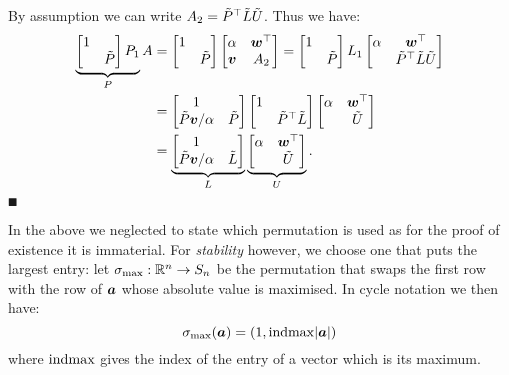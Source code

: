 By assumption we can write $A_2 = {\tilde P}^\top {\tilde L} {\tilde U}$. Thus we have:
\begin{align*}
\underbrace{\begin{bmatrix} 1 \\
            & {\tilde P} \end{bmatrix} P_1}_P A &= \begin{bmatrix} 1 \\
            & {\tilde P} \end{bmatrix}  \begin{bmatrix} \alpha & \bm{{\mbox{\boldmath$w$\unboldmath}}}^\top \\
                        \bm{{\mbox{\boldmath$v$\unboldmath}}} & A_2
                        \end{bmatrix}  =
            \begin{bmatrix} 1 \\ & {\tilde P} \end{bmatrix} L_1  \begin{bmatrix} \alpha & \bm{{\mbox{\boldmath$w$\unboldmath}}}^\top \\  & {\tilde P}^\top {\tilde L}  {\tilde U} \end{bmatrix} \\
            &= \begin{bmatrix}
1 \\
{\tilde P} \bm{{\mbox{\boldmath$v$\unboldmath}}}/\alpha & {\tilde P} \end{bmatrix} \begin{bmatrix} 1 &  \\  &  {\tilde P}^\top {\tilde L}  \end{bmatrix}  \begin{bmatrix} \alpha & \bm{{\mbox{\boldmath$w$\unboldmath}}}^\top \\  &  {\tilde U} \end{bmatrix} \\
&= \underbrace{\begin{bmatrix}
1 \\
{\tilde P} \bm{{\mbox{\boldmath$v$\unboldmath}}}/\alpha & {\tilde L}  \end{bmatrix}}_L \underbrace{\begin{bmatrix} \alpha & \bm{{\mbox{\boldmath$w$\unboldmath}}}^\top \\  &  {\tilde U} \end{bmatrix}}_U. \\
\end{align*}
\ensuremath{\QED}

In the above we neglected to state which permutation is used as for the proof of existence it is immaterial. For \emph{stability} however,  we choose one that puts the largest entry: let $\sigma_{\rm max} : {\mathbb R}^n \rightarrow S_n$ be the permutation that swaps the first row with the row of $\bm{{\mbox{\boldmath$a$\unboldmath}}}$ whose absolute value is maximised. In cycle notation we then have:
\[
\sigma_{\rm max}(\bm{{\mbox{\boldmath$a$\unboldmath}}}) = (1, {\rm indmax} |\bm{{\mbox{\boldmath$a$\unboldmath}}}|)
\]
where ${\rm indmax}$ gives the index of the entry of a vector which is its maximum.

